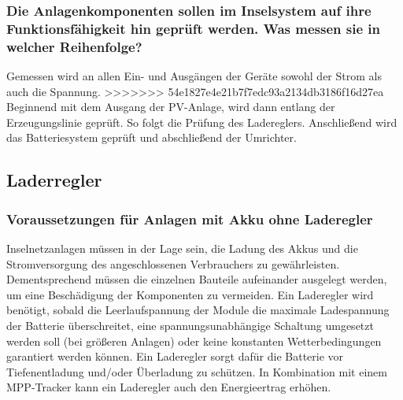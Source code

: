 \subsubsection{Die Anlagenkomponenten sollen im Inselsystem auf ihre Funktionsfähigkeit hin geprüft werden. Was messen sie in welcher Reihenfolge?}
Gemessen wird an allen Ein- und Ausgängen der Geräte sowohl der Strom als auch die Spannung.
>>>>>>> 54e1827e4e21b7f7edc93a2134db3186f16d27ea
Beginnend mit dem Ausgang der PV-Anlage, wird dann entlang der Erzeugungslinie geprüft.
So folgt die Prüfung des Ladereglers. Anschließend wird das Batteriesystem geprüft und abschließend der Umrichter.\\


\subsection{Laderregler}
\subsubsection{Voraussetzungen für Anlagen mit Akku ohne Laderegler}
Inselnetzanlagen müssen in der Lage sein, die Ladung des Akkus und die Stromversorgung des angeschlossenen Verbrauchers zu gewährleisten. Dementsprechend müssen die einzelnen Bauteile aufeinander ausgelegt werden, um eine Beschädigung der Komponenten zu vermeiden. Ein Laderegler wird benötigt, sobald die Leerlaufspannung der Module die maximale Ladespannung der Batterie überschreitet, eine spannungsunabhängige Schaltung umgesetzt werden soll (bei größeren Anlagen) oder keine konstanten Wetterbedingungen garantiert werden können. Ein Laderegler sorgt dafür die Batterie vor Tiefenentladung und/oder Überladung zu schützen. In Kombination mit einem MPP-Tracker kann ein Laderegler auch den Energieertrag erhöhen. 
